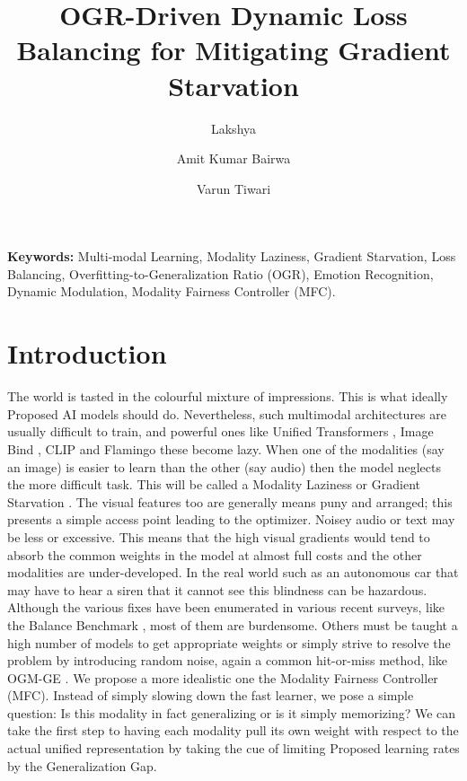 \documentclass[fleqn,10pt]{wlscirep}
\title{OGR-Driven Dynamic Loss Balancing for Mitigating Gradient Starvation}
\author[1]{Lakshya}
\author[1,*]{Amit Kumar Bairwa}
\author[1,*]{Varun Tiwari}
\affil[1]{Department of Artificial Intelligence and Machine Learning, School of Computer Science and Engineering, Manipal University Jaipur, Jaipur--Ajmer Express Highway, Jaipur, India.}
\affil[*]{amitkumar.bairwa@jaipur.manipal.edu}
\affil[*]{varun.tiwari@jaipur.manipal.edu}
\affil[*]{Corresponding Authors}
\begin{document}
\flushbottom
\maketitle
\thispagestyle{empty}

\noindent\textbf{Keywords:} Multi-modal Learning, Modality Laziness, Gradient Starvation, Loss Balancing, Overfitting-to-Generalization Ratio (OGR), Emotion Recognition, Dynamic Modulation, Modality Fairness Controller (MFC).

\section{Introduction}
The world is tasted in the colourful mixture of impressions. This is what ideally Proposed AI models should do. Nevertheless, such multimodal architectures are usually difficult to train, and powerful ones like Unified Transformers \cite{zhang2023meta}, Image Bind \cite{girdhar2023imagebind}, CLIP \cite{radford2021learning} and Flamingo \cite{alayrac2022flamingo} these become lazy. When one of the modalities (say an image) is easier to learn than the other (say audio) then the model neglects the more difficult task. This will be called a Modality Laziness or Gradient Starvation \cite{pezeshki2021gradient}. The visual features too are generally means puny and arranged; this presents a simple access point leading to the optimizer. Noisey audio or text may be less or excessive. This means that the high visual gradients would tend to absorb the common weights in the model at almost full costs and the other modalities are under-developed. In the real world such as an autonomous car that may have to hear a siren that it cannot see this blindness can be hazardous. Although the various fixes have been enumerated in various recent surveys, like the Balance Benchmark \cite{xu2025balancebenchmark}, most of them are burdensome. Others must be taught a high number of models to get appropriate weights or simply strive to resolve the problem by introducing random noise, again a common hit-or-miss method, like OGM-GE \cite{peng2022balanced}. We propose a more idealistic one the Modality Fairness Controller (MFC). Instead of simply slowing down the fast learner, we pose a simple question: Is this modality in fact generalizing or is it simply memorizing? We can take the first step to having each modality pull its own weight with respect to the actual unified representation by taking the cue of limiting Proposed learning rates by the Generalization Gap.
\end{document}
